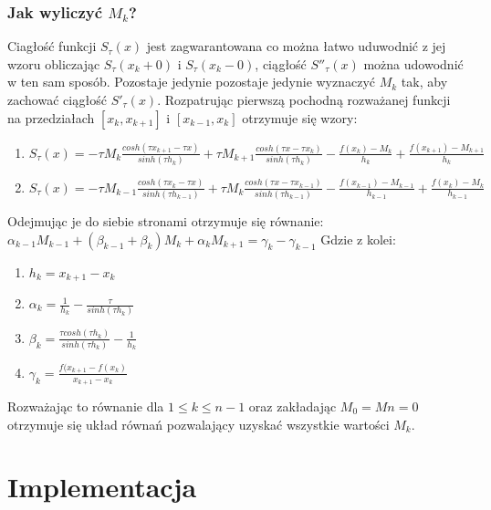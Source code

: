 \documentclass{article}
\begin{document}
\subsubsection{Jak wyliczyć $M_k$?}
Ciagłość funkcji $S_{\tau}(x)$ jest zagwarantowana co można łatwo uduwodnić z jej wzoru obliczając $S_{\tau}(x_{k}+0)$ i $S_{\tau}(x_{k}-0)$, ciągłość $S''_{\tau}(x)$ można udowodnić w ten sam sposób. Pozostaje jedynie pozostaje jedynie wyznaczyć $M_{k}$ tak, aby zachować ciągłość $S'_{\tau}(x)$.
Rozpatrując pierwszą pochodną rozważanej funkcji na przedziałach $[x_{k}, x_{k+1}]$ i $[x_{k-1}, x_{k}]$ otrzymuje się wzory:
\begin{enumerate}
\item $S_{\tau}(x)=-\tau M_{k} \frac{cosh(\tau x_{k+1} - \tau x)}{sinh(\tau h_{k})} + \tau M_{k+1} \frac{cosh(\tau x - \tau x_{k})}{sinh(\tau h_{k})} - \frac{f(x_{k})-M_{k}}{h_{k}} + \frac{f(x_{k+1}) - M_{k+1}}{h_{k}}$
\item $S_{\tau}(x)=-\tau M_{k-1} \frac{cosh(\tau x_{k} - \tau x)}{sinh(\tau h_{k-1})} + \tau M_{k} \frac{cosh(\tau x - \tau x_{k-1})}{sinh(\tau h_{k-1})} - \frac{f(x_{k-1})-M_{k-1}}{h_{k-1}} + \frac{f(x_{k}) - M_{k}}{h_{k-1}}$
\end{enumerate}
Odejmując je do siebie stronami otrzymuje się równanie:
\newline
$\alpha_{k-1}M_{k-1} + (\beta_{k-1} + \beta_{k}) M_{k} + \alpha_{k}M_{k+1} = \gamma_{k}- \gamma_{k-1}$
\newline
Gdzie z kolei:
\begin{enumerate}
\item $h_{k} = x_{k+1} - x_{k}$
\item $\alpha_{k} = \frac{1}{h_{k}} - \frac{\tau}{sinh(\tau h_{k})}$
\item $\beta_{k} = \frac{\tau cosh(\tau h_{k})}{sinh(\tau h_{k})} - \frac{1}{h_{k}}$
\item $\gamma_{k} = \frac{f(x_{k+1} - f(x_{k})}{x_{k+1}-x_{k}}$
\end{enumerate}
Rozważając to równanie dla $1 \leq k \leq n-1$ oraz zakładając $M_{0}=M{n}=0$ otrzymuje się układ równań pozwalający uzyskać wszystkie wartości $M_{k}$.

\newpage
\section{Implementacja}
\end{document}
